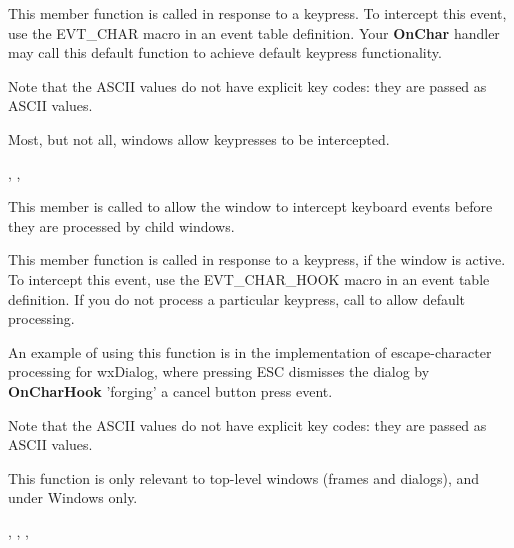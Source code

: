 

This member function is called in response to a keypress. To intercept this event,
use the EVT\_CHAR macro in an event table definition. Your {\bf OnChar} handler may call this
default function to achieve default keypress functionality.

Note that the ASCII values do not have explicit key codes: they are passed as ASCII
values.

Most, but not all, windows allow keypresses to be intercepted.


, ,\rtfsp
{}

\label{wxwindowoncharhook}


This member is called to allow the window to intercept keyboard events
before they are processed by child windows.




This member function is called in response to a keypress, if the window is active. To intercept this event,
use the EVT\_CHAR\_HOOK macro in an event table definition. If you do not process a particular
keypress, call  to allow default processing.

An example of using this function is in the implementation of escape-character processing for wxDialog,
where pressing ESC dismisses the dialog by {\bf OnCharHook} 'forging' a cancel button press event.

Note that the ASCII values do not have explicit key codes: they are passed as ASCII
values.

This function is only relevant to top-level windows (frames and dialogs), and under
Windows only.


, ,\rtfsp
{},\rtfsp
{}

